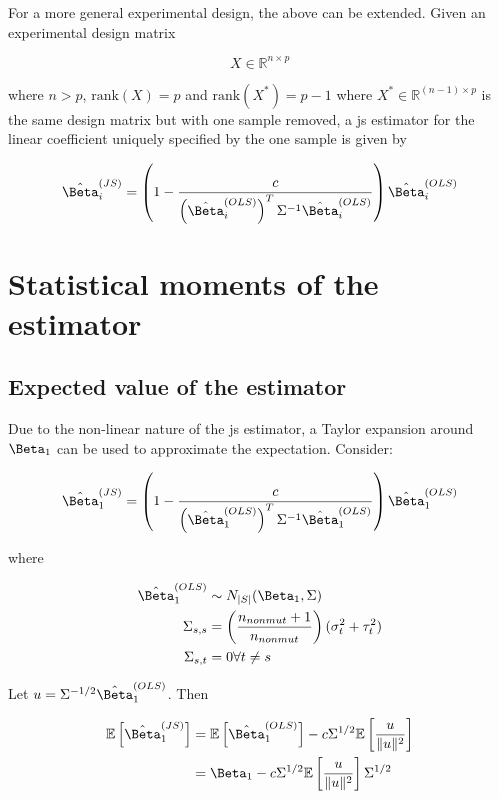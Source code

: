 For a more general experimental design, the above can be extended.
Given an experimental design matrix

\begin{equation*}
  X \in \mathbb{R}^{n \times p}
\end{equation*}

where $n > p$, $\text{rank}(X) = p$ and $\text{rank}(X^*) = p - 1$ where $X^* \in \mathbb{R}^{(n - 1) \times p}$ is the same design matrix but with one sample removed, a \gls{js} estimator for the linear coefficient uniquely specified by the one sample is given by

\begin{equation*}
  \hat{\Beta}_i^{(JS)} = \left( 1 - \frac{c}{\left( \hat{\Beta}_i^{(OLS)} \right)^T \Sigma^{-1} \hat{\Beta}_i^{(OLS)}} \right) \hat{\Beta}_i^{(OLS)}
\end{equation*}

\section{Statistical moments of the  estimator}
\label{sec:JS_moments}

\subsection{Expected value of the  estimator}

Due to the non-linear nature of the \gls{js} estimator, a Taylor expansion around $\Beta_1$ can be used to approximate the expectation.
Consider:

\begin{equation*}
  \hat{\Beta}_1^{(JS)} = \left( 1 - \frac{c}{\left( \hat{\Beta}_1^{(OLS)} \right)^T \Sigma^{-1} \hat{\Beta}_1^{(OLS)}} \right) \hat{\Beta}_1^{(OLS)}
\end{equation*}

where

\begin{align*}
  \hat{\Beta}_1^{(OLS)} &\sim N_{|S|}(\Beta_1, \Sigma) \\
  \Sigma_{s,s} &= \left( \frac{n_{nonmut} + 1}{n_{nonmut}} \right) (\sigma_t^2 + \tau_t^2) \\
  \Sigma_{s,t} &= 0 \forall t \ne s
\end{align*}

Let $u = \Sigma^{-1/2}\hat{\Beta}_1^{(OLS)}$.
Then

\begin{align*}
  \mathbb{E}\left[ \hat{\Beta}_1^{(JS)} \right] &= \mathbb{E} \left[ \hat{\Beta}_1^{(OLS)} \right] - c\Sigma^{1/2}\mathbb{E} \left[ \frac{u}{\Vert u \Vert ^2} \right] \\
  &= \Beta_1 - c\Sigma^{1/2}\mathbb{E} \left[ \frac{u}{\Vert u \Vert ^2} \right] \Sigma^{1/2}\\
\end{align*}

